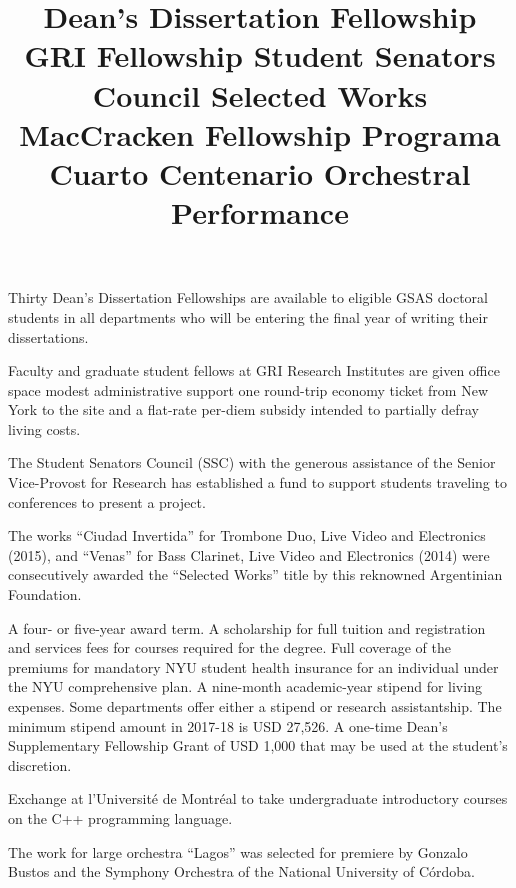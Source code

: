  \title{ Dean's Dissertation Fellowship}
 \begin{position}
{ Thirty Dean's Dissertation Fellowships are available to eligible GSAS doctoral students in all departments who will be entering the final year of writing their dissertations.}
\end{position}
 \title{ GRI Fellowship}
 \begin{position}
{ Faculty and graduate student fellows at GRI Research Institutes are given office space modest administrative support one round-trip economy ticket from New York to the site and a flat-rate per-diem subsidy intended to partially defray living costs.}
\end{position}
 
\newpage

 \title{ Student Senators Council}
 \begin{position}
{ The Student Senators Council (SSC) with the generous assistance of the Senior Vice-Provost for Research has established a fund to support students traveling to conferences to present a project.}
\end{position}
 \title{ Selected Works}
 \begin{position}
{ The works ``Ciudad Invertida'' for Trombone Duo, Live Video and Electronics (2015), and ``Venas'' for Bass Clarinet, Live Video and Electronics (2014) were consecutively awarded the ``Selected Works'' title by this reknowned Argentinian Foundation. }
\end{position}
 \title{ MacCracken Fellowship}
 \begin{position}
{ A four- or five-year award term. A scholarship for full tuition and registration and services fees for courses required for the degree. Full coverage of the premiums for mandatory NYU student health insurance for an individual under the NYU comprehensive plan. A nine-month academic-year stipend for living expenses. Some departments offer either a stipend or research assistantship. The minimum stipend amount in 2017-18 is USD 27,526. A one-time Dean’s Supplementary Fellowship Grant of USD 1,000 that may be used at the student’s discretion.}
\end{position}
 \title{ Programa Cuarto Centenario}
 \begin{position}
{ Exchange at l'Université de Montréal to take undergraduate introductory courses on the C++ programming language.}
\end{position}
 \title{ Orchestral Performance}
 \begin{position}
{ The work for large orchestra ``Lagos'' was selected for premiere by Gonzalo Bustos and the Symphony Orchestra of the National University of Córdoba.}
\end{position}